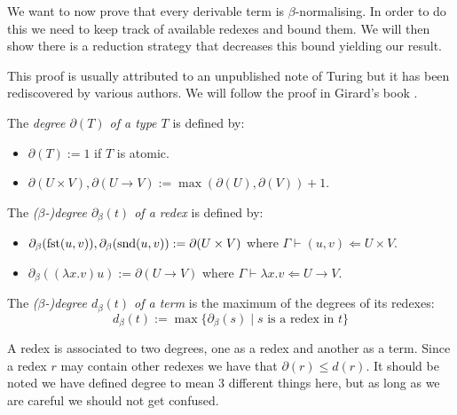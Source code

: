 We want to now prove that every derivable term is $\beta$-normalising. In order to do this we need to keep track of available redexes and bound them. We will then show there is a reduction strategy that decreases this bound yielding our result.

This proof is usually attributed to an unpublished note of Turing but it has been rediscovered by various authors. We will follow the proof in Girard's book \cite{Girard1989}.

\begin{defin}
    The \emph{degree $\partial(T)$ of a type $T$} is defined by:
    \begin{itemize}
        \item $\partial(T) := 1$ if $T$ is atomic.
        \item $\partial(U \times V), \partial(U \to V) := \max(\partial(U), \partial(V))+1$.
    \end{itemize}
\end{defin}

\begin{defin}
    The \emph{($\beta$-)degree $\partial_{\beta}(t)$ of a redex} is defined by:
    \begin{itemize}
        \item $\partial_{\beta}(\mathrm{fst}(u,v)), \partial_{\beta}(\mathrm{snd}(u,v)) := \partial(U\times V)$ where $\Gamma \vdash (u, v) \Leftarrow U \times V$.
        \item $\partial_{\beta}((\lambda x . v) u) := \partial(U \to V)$ where $\Gamma \vdash \lambda x . v \Leftarrow U \to V$.
    \end{itemize}
\end{defin}

\begin{defin}
    The \emph{($\beta$-)degree $d_{\beta}(t)$ of a term} is the maximum of the degrees of its redexes:
    $$
        d_{\beta}(t) := \max \{\partial_{\beta} (s) \mid s \text{ is a redex in } t\}
    $$
\end{defin}

\begin{remark}
    A redex is associated to two degrees, one as a redex and another as a term. Since a redex $r$ may contain other redexes we have that $\partial (r) \le d(r)$. It should be noted we have defined degree to mean 3 different things here, but as long as we are careful we should not get confused.
\end{remark}


